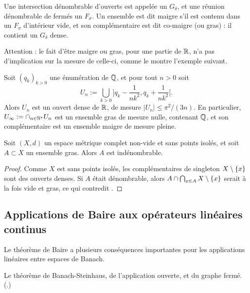 \begin{remark}
\label{rem:terminologieBaire}
%
Une intersection dénombrable d'ouverts est appelée un $G_\delta$, et une réunion dénombrable de fermés un $F_\sigma$. Un ensemble est dit maigre s'il est contenu dans un $F_\sigma$ d'intérieur vide, et son complémentaire est dit co-maigre (ou gras) : il contient un $G_\delta$ dense. 	
\end{remark}
 
Attention : le fait d'être maigre ou gras, pour une partie de $\mathbb{R}$, n'a pas d'implication sur la mesure de celle-ci, comme le montre l'exemple suivant. 
\begin{exemple}
\label{ex:GrasQ}
%
	Soit $(q_k)_{k >0}$ une énumération de $\mathbb{Q}$, et pour tout $n >0$ soit 
	\begin{equation}
	U_n := \bigcup_{k >0} \Big]q_k-\frac 1 {nk^2}, q_k + \frac 1 {n k^2}\Big[.	
	\end{equation}
	Alors $U_n$ est un ouvert dense de $\mathbb{R}$, de mesure $|U_n| \leq \pi^2/(3n)$. En particulier, $U_\infty :=  \cap_{n \in \mathbb{N}^*} U_n$ est un ensemble gras de mesure nulle, contenant $\mathbb{Q}$, et son complémentaire est un ensemble maigre de mesure pleine. 
\end{exemple}

\begin{exemple}	
\label{ex:grasNonDen}
%
	Soit $(X,d)$ un espace métrique complet non-vide et sans points isolés, et soit $A \subset X$ un ensemble gras. Alors $A$ est indénombrable. 
\end{exemple}

\begin{proof}
	Comme $X$ est sans points isolés, les complémentaires de singleton $X\setminus\{x\}$ sont des ouverts denses. Si $A$ était dénombrable, alors $A \cap \bigcap_{x \in A} X \setminus \{x\}$ serait à la fois vide et gras, ce qui contredit . 
\end{proof}


\subsection{Applications de Baire aux opérateurs linéaires continus} %
\label{subsec:BaireLin}

Le théorème de Baire a plusieurs conséquences importantes pour les applications linéaires entre espaces de Banach.

\begin{retenir}
	Le théorème de Banach-Steinhaus, de l'application ouverte, et du graphe fermé.
	(.)
\end{retenir}


